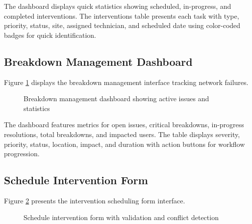 The dashboard displays quick statistics showing scheduled, in-progress, and completed interventions. The interventions table presents each task with type, priority, status, site, assigned technician, and scheduled date using color-coded badges for quick identification.

\subsection{Breakdown Management Dashboard}

Figure \ref{fig:sprint3-impl2} displays the breakdown management interface tracking network failures.

\begin{figure}[H]
\centering
{}
\caption{Breakdown management dashboard showing active issues and statistics}
\label{fig:sprint3-impl2}
\end{figure}

The dashboard features metrics for open issues, critical breakdowns, in-progress resolutions, total breakdowns, and impacted users. The table displays severity, priority, status, location, impact, and duration with action buttons for workflow progression.

\subsection{Schedule Intervention Form}

Figure \ref{fig:sprint3-impl3} presents the intervention scheduling form interface.

\begin{figure}[H]
\centering
{}
\caption{Schedule intervention form with validation and conflict detection}
\label{fig:sprint3-impl3}
\end{figure}

